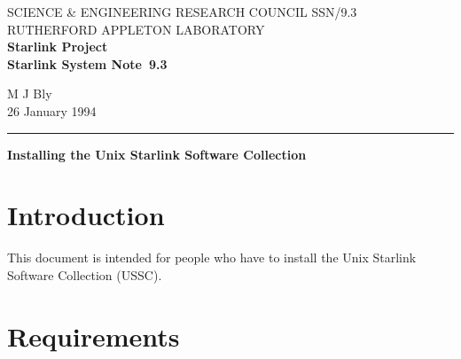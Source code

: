 \pagestyle{myheadings}

\newcommand{\stardoccategory} {Starlink System Note}
\newcommand{\stardocinitials} {SSN}
\newcommand{\stardocnumber}   {9.3}
\newcommand{\stardocauthors}  {M J Bly}
\newcommand{\stardocdate}     {26 January 1994}
\newcommand{\stardoctitle}    {Installing the Unix Starlink Software Collection}

\newcommand{\stardocname}{\stardocinitials /\stardocnumber}
\renewcommand{\_}{{\tt\char'137}}     %
\markright{\stardocname}
\setlength{\textwidth}{160mm}
\setlength{\textheight}{230mm}
\setlength{\topmargin}{-2mm}
\setlength{\oddsidemargin}{0mm}
\setlength{\evensidemargin}{0mm}
\setlength{\parindent}{0mm}
\setlength{\parskip}{\medskipamount}
\setlength{\unitlength}{1mm}



\thispagestyle{empty}
SCIENCE \& ENGINEERING RESEARCH COUNCIL \hfill \stardocname\\
RUTHERFORD APPLETON LABORATORY\\
{\large\bf Starlink Project\\}
{\large\bf \stardoccategory\ \stardocnumber}
\begin{flushright}
\stardocauthors\\
\stardocdate
\end{flushright}
\vspace{-4mm}
\rule{\textwidth}{0.5mm}
\vspace{5mm}
\begin{center}
{\Large\bf \stardoctitle}
\end{center}
\vspace{5mm}

\section{Introduction}

This document is intended for people who have to install the Unix
Starlink Software Collection (USSC).

\section{Requirements}

